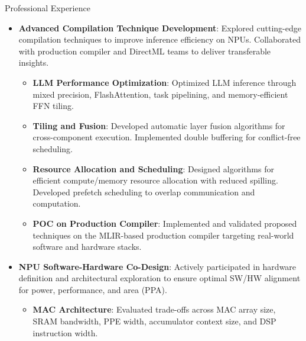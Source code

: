 \documentclass{resume} %
\begin{document}
\begin{rSection}{Professional Experience}
\begin{itemize}
\begin{itemize}
  \item \textbf{KPI Definition and Bottleneck Analysis}: 
  Defined key performance indicators using internal profiling toolsets. Analyzed performance bottlenecks in customer workloads (e.g., Microsoft, HP) to inform compiler feature planning and hardware evolution.
  
  \item \textbf{Model Coverage and Stability}: 
  Achieved support for over 800 models with 90\%+ coverage of Intel Open Model Zoo, ensuring broad compatibility and robustness.
\end{itemize}

\item \textbf{Advanced Compilation Technique Development}:
Explored cutting-edge compilation techniques to improve inference efficiency on NPUs. Collaborated with production compiler and DirectML teams to deliver transferable insights.
\begin{itemize}
  \item \textbf{LLM Performance Optimization}: 
  Optimized LLM inference through mixed precision, FlashAttention, task pipelining, and memory-efficient FFN tiling.
  
  \item \textbf{Tiling and Fusion}: 
  Developed automatic layer fusion algorithms for cross-component execution. Implemented double buffering for conflict-free scheduling.
  
  \item \textbf{Resource Allocation and Scheduling}: 
  Designed algorithms for efficient compute/memory resource allocation with reduced spilling. Developed prefetch scheduling to overlap communication and computation.
  
  \item \textbf{POC on Production Compiler}: 
  Implemented and validated proposed techniques on the MLIR-based production compiler targeting real-world software and hardware stacks.
\end{itemize}

\item \textbf{NPU Software-Hardware Co-Design}:
Actively participated in hardware definition and architectural exploration to ensure optimal SW/HW alignment for power, performance, and area (PPA).
\begin{itemize}
  \item \textbf{MAC Architecture}: 
  Evaluated trade-offs across MAC array size, SRAM bandwidth, PPE width, accumulator context size, and DSP instruction width.
  

\end{itemize}
\end{itemize}
\end{rSection}
\end{document}
